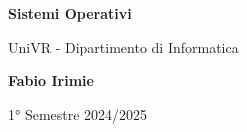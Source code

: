 \begin{titlepage}
	\begin{center}
		\vspace*{1cm}

		\Huge
		\textbf{Sistemi Operativi}

		\vspace{0.5cm}
		\LARGE
		UniVR - Dipartimento di Informatica

		\vspace{1.5cm}

		\textbf{Fabio Irimie}

		\vfill


		\vspace{0.8cm}


		1° Semestre 2024/2025

	\end{center}
\end{titlepage}
